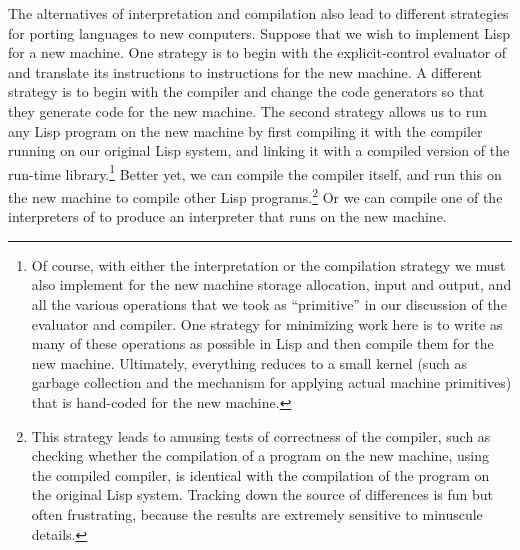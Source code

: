 The alternatives of interpretation and compilation also lead to different
strategies for porting languages to new computers. Suppose that we wish to
implement Lisp for a new machine.  One strategy is to begin with the
explicit-control evaluator of  and translate its instructions
to instructions for the new machine.  A different strategy is to begin with the
compiler and change the code generators so that they generate code for the new
machine.  The second strategy allows us to run any Lisp program on the new
machine by first compiling it with the compiler running on our original Lisp
system, and linking it with a compiled version of the run-time
library.\footnote{Of course, with either the interpretation or the compilation
strategy we must also implement for the new machine storage allocation, input
and output, and all the various operations that we took as ``primitive'' in our
discussion of the evaluator and compiler.  One strategy for minimizing work
here is to write as many of these operations as possible in Lisp and then
compile them for the new machine.  Ultimately, everything reduces to a small
kernel (such as garbage collection and the mechanism for applying actual
machine primitives) that is hand-coded for the new machine.} Better yet, we can
compile the compiler itself, and run this on the new machine to compile other
Lisp programs.\footnote{This strategy leads to amusing tests of correctness of
the compiler, such as checking whether the compilation of a program on the new
machine, using the compiled compiler, is identical with the compilation of the
program on the original Lisp system.  Tracking down the source of differences
is fun but often frustrating, because the results are extremely sensitive to
minuscule details.}  Or we can compile one of the interpreters of
 to produce an interpreter that runs on the new machine.

